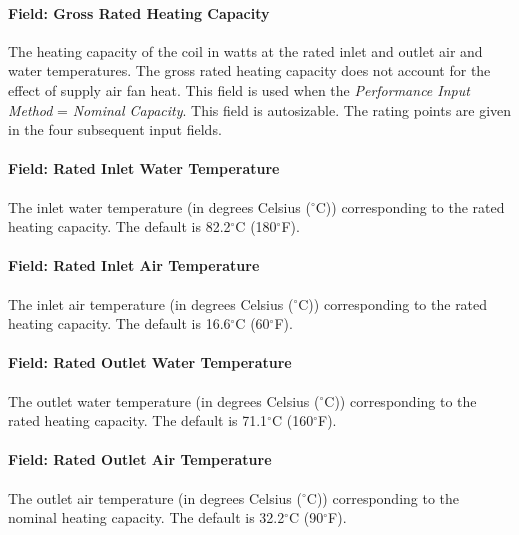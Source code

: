 \paragraph{Field: Gross Rated Heating Capacity}\label{field-gross-rated-heating-capacity}

The heating capacity of the coil in watts at the rated inlet and outlet air and water temperatures. The gross rated heating capacity does not account for the effect of supply air fan heat. This field is used when the \emph{Performance Input Method} = \emph{Nominal Capacity}. This field is autosizable. The rating points are given in the four subsequent input fields.

\paragraph{Field: Rated Inlet Water Temperature}\label{field-rated-inlet-water-temperature}

The inlet water temperature (in degrees Celsius ($^\circ$C)) corresponding to the rated heating capacity. The default is 82.2$^\circ$C (180$^\circ$F).

\paragraph{Field: Rated Inlet Air Temperature}\label{field-rated-inlet-air-temperature}

The inlet air temperature (in degrees Celsius ($^\circ$C)) corresponding to the rated heating capacity. The default is 16.6$^\circ$C (60$^\circ$F).

\paragraph{Field: Rated Outlet Water Temperature}\label{field-rated-outlet-water-temperature}

The outlet water temperature (in degrees Celsius ($^\circ$C)) corresponding to the rated heating capacity. The default is 71.1$^\circ$C (160$^\circ$F).

\paragraph{Field: Rated Outlet Air Temperature}\label{field-rated-outlet-air-temperature}

The outlet air temperature (in degrees Celsius ($^\circ$C)) corresponding to the nominal heating capacity. The default is 32.2$^\circ$C (90$^\circ$F).

